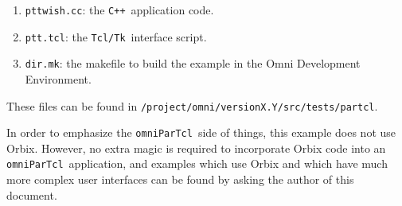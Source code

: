 \documentclass[11pt,twoside,onecolumn]{article}
\def\omniParTcl{{\tt omniParTcl}}
\def\tcltk{{\tt Tcl/Tk}}
\def\CXX{{\tt C++}}
\begin{document}
\begin{enumerate}
\item {\tt pttwish.cc}: the \CXX\ application code.
\item {\tt ptt.tcl}: the \tcltk\ interface script.
\item {\tt dir.mk}: the makefile to build the example in the Omni
                       Development Environment.
\end{enumerate}

\noindent
These files can be found in
{\tt /project/omni/versionX.Y/src/tests/partcl}.

\medskip

In order to emphasize the \omniParTcl\ side of things, this example does
not use Orbix.  However, no extra magic is required to incorporate Orbix
code into an \omniParTcl\ application, and examples which use Orbix
and which have much more complex user interfaces can be found by asking the
author of this document.
\end{document}
